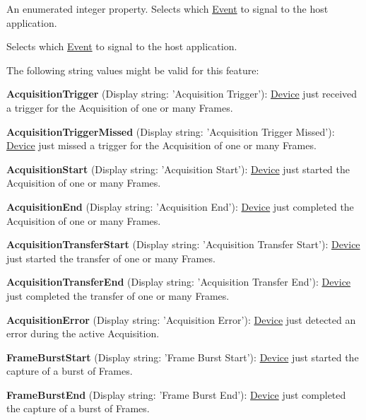 An enumerated integer property. Selects which \hyperlink{classmv_i_m_p_a_c_t_1_1acquire_1_1_event}{Event} to signal to the host application. 

Selects which \hyperlink{classmv_i_m_p_a_c_t_1_1acquire_1_1_event}{Event} to signal to the host application.

The following string values might be valid for this feature\+:
\begin{DoxyItemize}
\item {\bfseries Acquisition\+Trigger} (Display string\+: 'Acquisition Trigger')\+: \hyperlink{classmv_i_m_p_a_c_t_1_1acquire_1_1_device}{Device} just received a trigger for the Acquisition of one or many Frames.
\item {\bfseries Acquisition\+Trigger\+Missed} (Display string\+: 'Acquisition Trigger Missed')\+: \hyperlink{classmv_i_m_p_a_c_t_1_1acquire_1_1_device}{Device} just missed a trigger for the Acquisition of one or many Frames.
\item {\bfseries Acquisition\+Start} (Display string\+: 'Acquisition Start')\+: \hyperlink{classmv_i_m_p_a_c_t_1_1acquire_1_1_device}{Device} just started the Acquisition of one or many Frames.
\item {\bfseries Acquisition\+End} (Display string\+: 'Acquisition End')\+: \hyperlink{classmv_i_m_p_a_c_t_1_1acquire_1_1_device}{Device} just completed the Acquisition of one or many Frames.
\item {\bfseries Acquisition\+Transfer\+Start} (Display string\+: 'Acquisition Transfer Start')\+: \hyperlink{classmv_i_m_p_a_c_t_1_1acquire_1_1_device}{Device} just started the transfer of one or many Frames.
\item {\bfseries Acquisition\+Transfer\+End} (Display string\+: 'Acquisition Transfer End')\+: \hyperlink{classmv_i_m_p_a_c_t_1_1acquire_1_1_device}{Device} just completed the transfer of one or many Frames.
\item {\bfseries Acquisition\+Error} (Display string\+: 'Acquisition Error')\+: \hyperlink{classmv_i_m_p_a_c_t_1_1acquire_1_1_device}{Device} just detected an error during the active Acquisition.
\item {\bfseries Frame\+Burst\+Start} (Display string\+: 'Frame Burst Start')\+: \hyperlink{classmv_i_m_p_a_c_t_1_1acquire_1_1_device}{Device} just started the capture of a burst of Frames.
\item {\bfseries Frame\+Burst\+End} (Display string\+: 'Frame Burst End')\+: \hyperlink{classmv_i_m_p_a_c_t_1_1acquire_1_1_device}{Device} just completed the capture of a burst of Frames.

\end{DoxyItemize}
